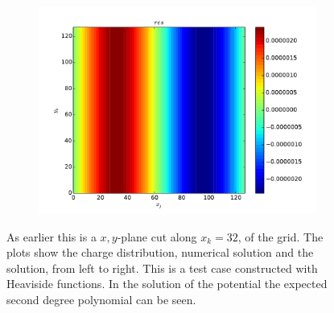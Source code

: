 \begin{figure}
\begin{subfigure}[b]{0.32\textwidth}
			\end{subfigure}
			\begin{subfigure}[b]{0.32\textwidth}
				\includegraphics[width = \textwidth]{figures/verification/analytical/heaviside/residual.pdf}
			\end{subfigure}
		\caption{As earlier this is a \(x,y\)-plane cut along \(x_k=32\), of the grid. The plots show the charge distribution,
		numerical solution and the solution, from left to right. This is a test case constructed
		with Heaviside functions. In the solution of the potential the expected second degree polynomial can be seen.
		}
		\label{fig:heaviside}
	\end{figure}

